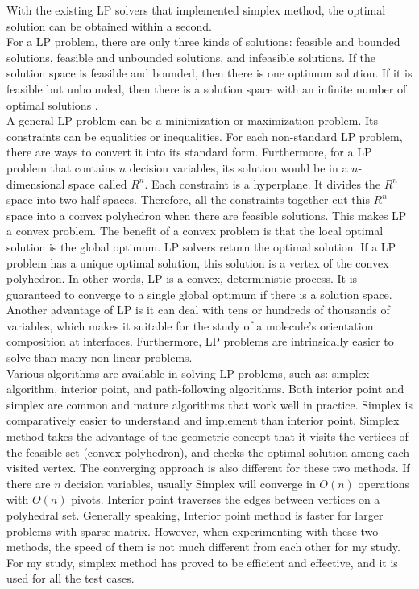 With the existing LP solvers that implemented simplex method, the optimal solution can be obtained within a second. \\

For a LP problem, there are only three kinds of solutions: feasible and bounded solutions, feasible and unbounded solutions, and infeasible solutions. If the solution space is feasible and bounded, then there is one optimum solution. If it is feasible but unbounded, then there is a solution space with an infinite number of optimal solutions \cite{LP}. \\

A general LP problem can be a minimization or maximization problem. Its constraints can be equalities or inequalities. For each non-standard LP problem, there are ways to convert it into its standard form. Furthermore, for a LP problem that contains $n$ decision variables, its solution would be in a $n$-dimensional space called $R^{n}$. Each constraint is a hyperplane. It divides the $R^{n}$ space into two half-spaces. Therefore, all the constraints together cut this $R^{n}$ space into a convex polyhedron when there are feasible solutions. This makes LP a convex problem. The benefit of a convex problem is that the local optimal solution is the global optimum. LP solvers return the optimal solution. If a LP problem has a unique optimal solution, this solution is a vertex of the convex polyhedron. In other words, LP is a convex, deterministic process. It is guaranteed to converge to a single global optimum if there is a solution space. \\

Another advantage of LP is it can deal with tens or hundreds of thousands of variables, which makes it suitable for the study of a molecule's orientation composition at interfaces. Furthermore, LP problems are intrinsically easier to solve than many non-linear problems. \\

Various algorithms are available in solving LP problems, such as: simplex algorithm, interior point, and path-following algorithms. Both interior point and simplex are common and mature algorithms that work well in practice. Simplex is comparatively easier to understand and implement than interior point. Simplex method takes the advantage of the geometric concept that it visits the vertices of the feasible set (convex polyhedron), and checks the optimal solution among each visited vertex. The converging approach is also different for these two methods. If there are $n$ decision variables, usually Simplex will converge in $O(n)$ operations with $O(n)$ pivots. Interior point traverses the edges between vertices on a polyhedral set. Generally speaking, Interior point method is faster for larger problems with sparse matrix. However, when experimenting with these two methods, the speed of them is not much different from each other for my study. For my study, simplex method has proved to be efficient and effective, and it is used for all the test cases. \\

